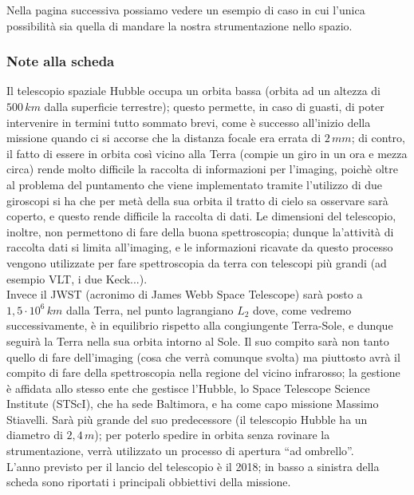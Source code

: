Nella pagina successiva possiamo vedere un esempio di caso in cui l'unica possibilità  sia quella di mandare la nostra strumentazione nello spazio.

\subsubsection{Note alla scheda}
Il telescopio spaziale Hubble occupa un orbita bassa (orbita ad un altezza di $500 \, km$ dalla superficie terrestre); questo permette, in caso di guasti, di poter intervenire in termini tutto sommato brevi, come è successo all'inizio della missione quando ci si accorse che la distanza focale era errata di $2 \, mm$; di contro, il fatto di essere in orbita così vicino alla Terra (compie un giro in un ora e mezza circa) rende molto difficile la raccolta di informazioni per l'imaging, poichè oltre al problema del puntamento che viene implementato tramite l'utilizzo di due giroscopi si ha che per metà della sua orbita il tratto di cielo sa osservare sarà coperto, e questo rende difficile la raccolta di dati. Le dimensioni del telescopio, inoltre, non permettono di fare della buona spettroscopia; dunque la'attività di raccolta dati si limita all'imaging, e le informazioni ricavate da questo processo vengono utilizzate per fare spettroscopia da terra con telescopi più grandi (ad esempio VLT, i due Keck...).\\
Invece il JWST (acronimo di James Webb Space Telescope) sarà posto a $1,5 \cdot 10^6 \, km$ dalla Terra, nel punto lagrangiano $L_2$ dove, come vedremo successivamente, è in equilibrio rispetto alla congiungente Terra-Sole, e  dunque seguirà la Terra nella sua orbita intorno al Sole. Il suo compito sarà non tanto quello di fare dell'imaging (cosa che verrà comunque svolta) ma piuttosto avrà il compito di fare della spettroscopia nella regione del vicino infrarosso; la gestione è affidata allo stesso ente che gestisce l'Hubble, lo Space Telescope Science Institute (STScI), che ha sede  Baltimora, e ha come capo missione Massimo Stiavelli. Sarà più grande del suo predecessore (il telescopio Hubble ha un diametro di $2,4 \, m$); per poterlo spedire in orbita senza rovinare la strumentazione, verrà utilizzato un processo di apertura ``ad ombrello''.\\
L'anno previsto per il lancio del telescopio è il 2018; in basso a sinistra della scheda sono riportati i principali obbiettivi della missione.

\clearpage


